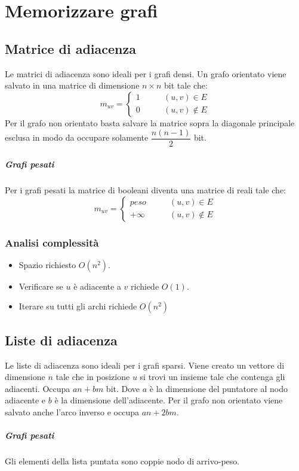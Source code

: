 \section{Memorizzare grafi}
\subsection{Matrice di adiacenza}
Le matrici di adiacenza sono ideali per i grafi densi. Un grafo orientato viene salvato in una matrice di dimensione $n\times n$ bit tale che:
\begin{equation*}
m_{uv}=\begin{cases}1\qquad& (u, v)\in E\\
0 & (u, v)\not\in E
\end{cases}
\end{equation*}
Per il grafo non orientato basta salvare la matrice sopra la diagonale principale esclusa in modo da occupare solamente $\dfrac{n(n-1)}{2}$ bit.
\subparagraph{Grafi pesati}
Per i grafi pesati la matrice di booleani diventa una matrice di reali tale che: 
\begin{equation*}
m_{uv}=\begin{cases}peso\qquad& (u, v)\in E\\
+\infty & (u, v)\not\in E
\end{cases}
\end{equation*}
\subsubsection{Analisi complessit\`a}
\begin{itemize}
\item Spazio richiesto $O(n^2)$.
\item Verificare se $u$ \`e adiacente a $v$ richiede $O(1)$.
\item Iterare su tutti gli archi richiede $O(n^2)$
\end{itemize}
\subsection{Liste di adiacenza}
Le liste di adiacenza sono ideali per i grafi sparsi. Viene creato un vettore di dimensione $n$ tale che in posizione $u$ si trovi un insieme tale che 
contenga gli adiacenti. Occupa $an+bm$ bit. Dove $a$ \`e la dimensione del puntatore al nodo adiacente e $b$ \`e la dimensione dell'adiacente. Per il grafo 
non orientato viene salvato anche l'arco inverso e occupa $an+2bm$.
\subparagraph{Grafi pesati}
Gli elementi della lista puntata sono coppie nodo di arrivo-peso.
